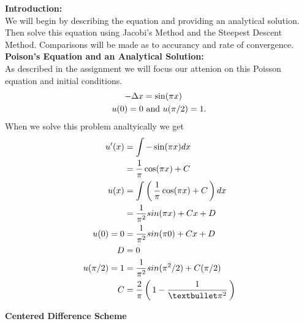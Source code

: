 \documentclass[12pt,a4paper]{report}
\begin{document}
\noindent\textbf{Introduction:}\\

	We will begin by describing the equation and providing an analytical solution.  Then solve this equation using Jacobi's Method and the Steepest Descent Method.  Comparisons will be made as to accurancy and rate of convergence.\\
	
\noindent\textbf{Poison's Equation and an Analytical Solution:}\\

As described in the assignment we will focus our attenion on this Poisson equation and initial conditions.
\begin{align*}
	-\Delta x &= \sin(\pi x)\\
	u(0) = 0 &\text{ and } u(\pi/2)=1.
\end{align*}When we solve this problem analtyically we get
\begin{align*}
	u'(x) &= \int -\sin(\pi x) dx \\
	&= \frac{1}{\pi}\cos(\pi x)+C \\
	u(x) &= \int \PAREN{\frac{1}{\pi}\cos(\pi x)+C} dx \\
	&= \frac{1}{\pi^2}sin(\pi x) + Cx + D \\
	u(0) = 0 &= \frac{1}{\pi^2}sin(\pi 0) + Cx + D \\
	D &= 0 \\
	u(\pi/2) =1 &= \frac{1}{\pi^2}sin(\pi^2/2) + C(\pi/2) \\
	C &= \frac{2}{\pi}\PAREN{1-\frac{1}{•\pi^2}}
\end{align*}

\noindent\textbf{Centered Difference Scheme}\\
\end{document}
